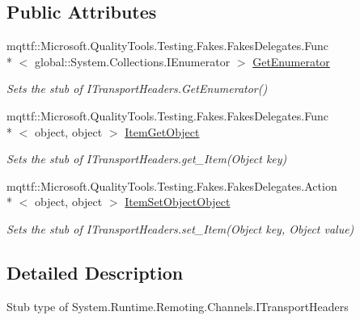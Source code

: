 \subsection*{Public Attributes}
\begin{DoxyCompactItemize}
\item 
mqttf\-::\-Microsoft.\-Quality\-Tools.\-Testing.\-Fakes.\-Fakes\-Delegates.\-Func\\*
$<$ global\-::\-System.\-Collections.\-I\-Enumerator $>$ \hyperlink{class_system_1_1_runtime_1_1_remoting_1_1_channels_1_1_fakes_1_1_stub_i_transport_headers_a3abdd2cab8af6d0a1b10fcb410f5afd3}{Get\-Enumerator}
\begin{DoxyCompactList}\small\item\em Sets the stub of I\-Transport\-Headers.\-Get\-Enumerator()\end{DoxyCompactList}\item 
mqttf\-::\-Microsoft.\-Quality\-Tools.\-Testing.\-Fakes.\-Fakes\-Delegates.\-Func\\*
$<$ object, object $>$ \hyperlink{class_system_1_1_runtime_1_1_remoting_1_1_channels_1_1_fakes_1_1_stub_i_transport_headers_ae9928f33e6d43bea9661b5ac8b3804b0}{Item\-Get\-Object}
\begin{DoxyCompactList}\small\item\em Sets the stub of I\-Transport\-Headers.\-get\-\_\-\-Item(\-Object key)\end{DoxyCompactList}\item 
mqttf\-::\-Microsoft.\-Quality\-Tools.\-Testing.\-Fakes.\-Fakes\-Delegates.\-Action\\*
$<$ object, object $>$ \hyperlink{class_system_1_1_runtime_1_1_remoting_1_1_channels_1_1_fakes_1_1_stub_i_transport_headers_a05209b3858e8f172e3ae70f143d9740f}{Item\-Set\-Object\-Object}
\begin{DoxyCompactList}\small\item\em Sets the stub of I\-Transport\-Headers.\-set\-\_\-\-Item(\-Object key, Object value)\end{DoxyCompactList}\end{DoxyCompactItemize}


\subsection{Detailed Description}
Stub type of System.\-Runtime.\-Remoting.\-Channels.\-I\-Transport\-Headers



